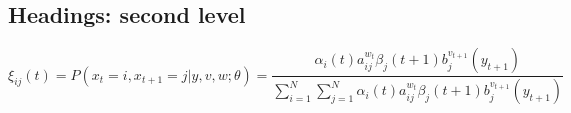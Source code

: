 \subsection{Headings: second level}
\lipsum[5]
\begin{equation}
\xi _{ij}(t)=P(x_{t}=i,x_{t+1}=j|y,v,w;\theta)= {\frac {\alpha _{i}(t)a^{w_t}_{ij}\beta _{j}(t+1)b^{v_{t+1}}_{j}(y_{t+1})}{\sum _{i=1}^{N} \sum _{j=1}^{N} \alpha _{i}(t)a^{w_t}_{ij}\beta _{j}(t+1)b^{v_{t+1}}_{j}(y_{t+1})}}
\end{equation}
